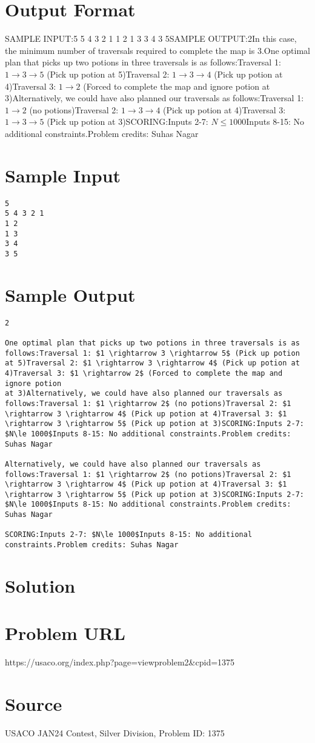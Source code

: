 \documentclass[12pt]{article}
\begin{document}
\section*{Output Format}
SAMPLE INPUT:5
5 4 3 2 1
1 2
1 3
3 4
3 5SAMPLE OUTPUT:2In this case, the minimum number of traversals required to complete the map is
$3$.One optimal plan that picks up two potions in three traversals is as follows:Traversal 1: $1 \rightarrow 3 \rightarrow 5$ (Pick up potion at 5)Traversal 2: $1 \rightarrow 3 \rightarrow 4$ (Pick up potion at 4)Traversal 3: $1 \rightarrow 2$ (Forced to complete the map and ignore potion
at 3)Alternatively, we could have also planned our traversals as follows:Traversal 1: $1 \rightarrow 2$ (no potions)Traversal 2: $1 \rightarrow 3 \rightarrow 4$ (Pick up potion at 4)Traversal 3: $1 \rightarrow 3 \rightarrow 5$ (Pick up potion at 3)SCORING:Inputs 2-7: $N\le 1000$Inputs 8-15: No additional constraints.Problem credits: Suhas Nagar

\section*{Sample Input}
\begin{verbatim}
5
5 4 3 2 1
1 2
1 3
3 4
3 5
\end{verbatim}

\section*{Sample Output}
\begin{verbatim}
2

One optimal plan that picks up two potions in three traversals is as follows:Traversal 1: $1 \rightarrow 3 \rightarrow 5$ (Pick up potion at 5)Traversal 2: $1 \rightarrow 3 \rightarrow 4$ (Pick up potion at 4)Traversal 3: $1 \rightarrow 2$ (Forced to complete the map and ignore potion
at 3)Alternatively, we could have also planned our traversals as follows:Traversal 1: $1 \rightarrow 2$ (no potions)Traversal 2: $1 \rightarrow 3 \rightarrow 4$ (Pick up potion at 4)Traversal 3: $1 \rightarrow 3 \rightarrow 5$ (Pick up potion at 3)SCORING:Inputs 2-7: $N\le 1000$Inputs 8-15: No additional constraints.Problem credits: Suhas Nagar

Alternatively, we could have also planned our traversals as follows:Traversal 1: $1 \rightarrow 2$ (no potions)Traversal 2: $1 \rightarrow 3 \rightarrow 4$ (Pick up potion at 4)Traversal 3: $1 \rightarrow 3 \rightarrow 5$ (Pick up potion at 3)SCORING:Inputs 2-7: $N\le 1000$Inputs 8-15: No additional constraints.Problem credits: Suhas Nagar

SCORING:Inputs 2-7: $N\le 1000$Inputs 8-15: No additional constraints.Problem credits: Suhas Nagar
\end{verbatim}

\section*{Solution}


\section*{Problem URL}
https://usaco.org/index.php?page=viewproblem2&cpid=1375

\section*{Source}
USACO JAN24 Contest, Silver Division, Problem ID: 1375
\end{document}
